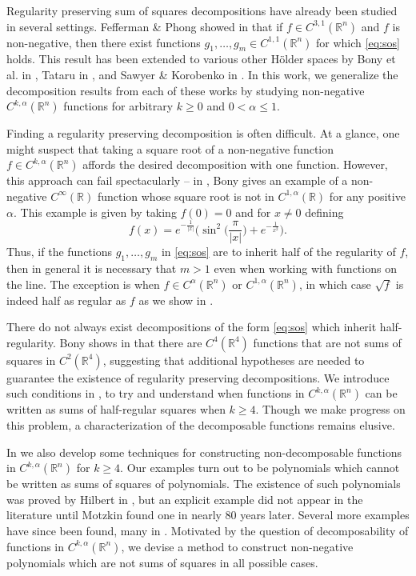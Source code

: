 \documentclass[oneside,hidelinks,indentfirst,10pt]{book}
\begin{document}
Regularity preserving sum of squares decompositions have already been studied in several settings. Fefferman \& Phong showed in \cite{Fefferman-Phong} that if \(f\in C^{3,1}(\mathbb{R}^n)\) and \(f\) is non-negative, then there exist functions \(g_1,\dots,g_m\in C^{1,1}(\mathbb{R}^n)\) for which \eqref{eq:sos} holds. This result has been extended to various other H\"older spaces by Bony et al. in \cite{Bony}, Tataru in \cite{Tataru}, and Sawyer \& Korobenko in \cite{SOS_I}. In this work, we generalize the decomposition results from each of these works by studying non-negative \(C^{k,\alpha}(\mathbb{R}^n)\) functions for arbitrary \(k\geq 0\) and \(0<\alpha\leq 1\).


Finding a regularity preserving decomposition is often difficult. At a glance, one might suspect that taking a square root of a non-negative function \(f\in C^{k,\alpha}(\mathbb{R}^n)\) affords the desired decomposition with one function. However, this approach can fail spectacularly -- in \cite{Bony}, Bony gives an example of a non-negative \(C^\infty(\mathbb{R})\) function whose square root is not in \(C^{1,\alpha}(\mathbb{R})\) for any positive \(\alpha\). This example is given by taking \(f(0)=0\) and for \(x\neq0\) defining
\[
    f(x)=e^{-\frac{1}{|x|}}\bigg(\sin^2\bigg(\frac{\pi}{|x|}\bigg)+e^{-\frac{1}{x^2}}\bigg).
\]
Thus, if the functions \(g_1,\dots,g_m\) in \eqref{eq:sos} are to inherit half of the regularity of \(f\), then in general it is necessary that \(m> 1\) even when working with functions on the line. The exception is when \(f\in C^{\alpha}(\mathbb{R}^n)\) or \(C^{1,\alpha}(\mathbb{R}^n)\), in which case \(\sqrt{f}\) is indeed half as regular as \(f\) as we show in .


There do not always exist decompositions of the form \eqref{eq:sos} which inherit half-regularity. Bony shows in \cite{Bony} that there are \(C^4(\mathbb{R}^4)\) functions that are not sums of squares in \(C^2(\mathbb{R}^4)\), suggesting that additional hypotheses are needed to guarantee the existence of regularity preserving decompositions. We introduce such conditions in , to try and understand when functions in \(C^{k,\alpha}(\mathbb{R}^n)\) can be written as sums of half-regular squares when \(k\geq 4\). Though we make progress on this problem, a characterization of the decomposable functions remains elusive.


In  we also develop some techniques for constructing non-decomposable functions in \(C^{k,\alpha}(\mathbb{R}^n)\) for \(k\geq 4\). Our examples turn out to be polynomials which cannot be written as sums of squares of polynomials. The existence of such polynomials was proved by Hilbert in \cite{Hilbert}, but an explicit example did not appear in the literature until Motzkin found one in \cite{Motzkin} nearly 80 years later. Several more examples have since been found, many in \cite{reznik_extpsd}. Motivated by the question of decomposability of functions in \(C^{k,\alpha}(\mathbb{R}^n)\), we devise a method to construct non-negative polynomials which are not sums of squares in all possible cases.
\end{document}
